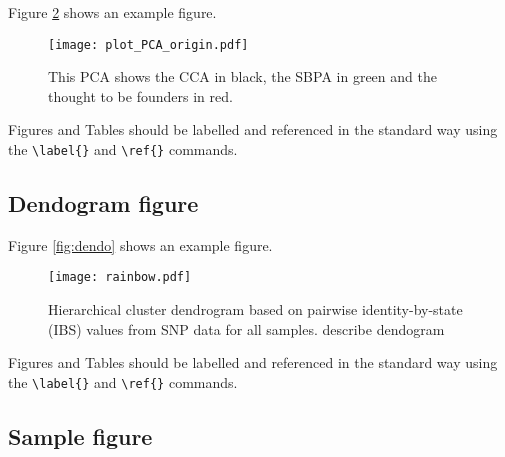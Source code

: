 \documentclass[9pt,twocolumn,twoside,lineno]{gsajnl}
\begin{document}
Figure \ref{fig:pca} shows an example figure.

\begin{figure}[t]
\centering
\texttt{[image: plot\_PCA\_origin.pdf]}
\caption{This PCA shows the CCA in black, the SBPA in green and the thought to be founders in red.}%
\label{fig:pca}
\end{figure}


Figures and Tables should be labelled and referenced in the standard way using the \verb|\label{}| and \verb|\ref{}| commands.

\subsection{Dendogram figure}

Figure \ref{fig:dendo} shows an example figure.

\begin{figure}[t]
\centering
\texttt{[image: rainbow.pdf]}
\caption{Hierarchical cluster dendrogram based on pairwise identity-by-state (IBS) values from SNP data for all samples. describe dendogram}%
\label{fig:pca}
\end{figure}


Figures and Tables should be labelled and referenced in the standard way using the \verb|\label{}| and \verb|\ref{}| commands.

\subsection{Sample figure}
\end{document}
